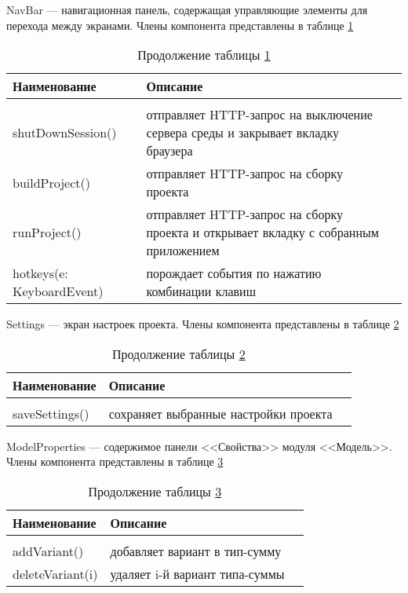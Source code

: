 NavBar --- навигационная панель, содержащая управляющие элементы для перехода между экранами. Члены компонента представлены в таблице \ref{tab:class2}

\begin{longtable} {| p{8.3cm} | p{8.35cm}l |}
	\caption{Члены компонента NavBar}
	\label{tab:class2}\\
	\hline
	\centering Наименование &  \centering Описание & \\
	\hline
	\endfirsthead
	\caption*{Продолжение таблицы \ref{tab:class2}}\\
	\hline
	\endhead
	\hline
	\endfoot
	shutDownSession() & отправляет HTTP-запрос на выключение сервера среды и закрывает вкладку браузера & \\
	\hline
	buildProject() & отправляет HTTP-запрос на сборку проекта & \\
	\hline
	runProject() & отправляет HTTP-запрос на сборку проекта и открывает вкладку с собранным приложением & \\
	\hline
	hotkeys(e: KeyboardEvent) & порождает события по нажатию комбинации клавиш & \\
\end{longtable}

Settings --- экран настроек проекта. Члены компонента представлены в таблице \ref{tab:class3}

\begin{longtable} {| p{8.3cm} | p{8.35cm}l |}
	\caption{Члены компонента Settings}
	\label{tab:class3}\\
	\hline
	\centering Наименование &  \centering Описание & \\
	\hline
	\endfirsthead
	\caption*{Продолжение таблицы \ref{tab:class3}}\\
	\hline
	\endhead
	\hline
	\endfoot
	saveSettings() & сохраняет выбранные настройки проекта & \\
\end{longtable}

ModelProperties --- содержимое панели <<Свойства>> модуля <<Модель>>. Члены компонента представлены в таблице \ref{tab:class4}

\begin{longtable} {| p{8.3cm} | p{8.35cm}l |}
	\caption{Члены компонента ModelProperties}
	\label{tab:class4}\\
	\hline
	\centering Наименование &  \centering Описание & \\
	\hline
	\endfirsthead
	\caption*{Продолжение таблицы \ref{tab:class4}}\\
	\hline
	\endhead
	\hline
	\endfoot
	addVariant() & добавляет вариант в тип-сумму & \\
	\hline
	deleteVariant(i) & удаляет i-й вариант типа-суммы & \\
\end{longtable}

